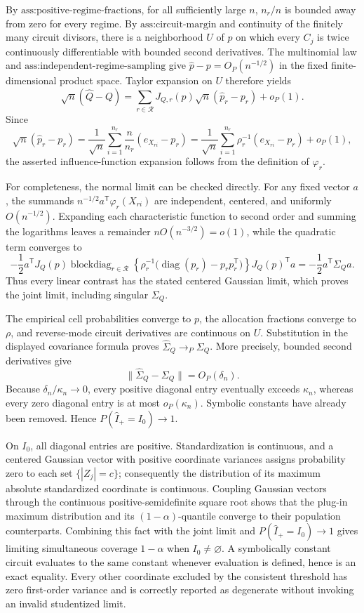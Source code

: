 By \(\text{ass:positive-regime-fractions}\), for all sufficiently large \(n\), \(n_r/n\) is bounded away from zero for every regime.  By \(\text{ass:circuit-margin}\) and continuity of the finitely many circuit divisors, there is a neighborhood \(U\) of \(p\) on which every \(C_j\) is twice continuously differentiable with bounded second derivatives.  The multinomial law and \(\text{ass:independent-regime-sampling}\) give \(\widehat p-p=O_P(n^{-1/2})\) in the fixed finite-dimensional product space.  Taylor expansion on \(U\) therefore yields
\[
 \sqrt n(\widehat Q-Q)=\sum_{r\in\mathcal R}J_{Q,r}(p)\sqrt n(\widehat p_r-p_r)+o_P(1).
\]
Since
\[
 \sqrt n(\widehat p_r-p_r)=\frac1{\sqrt n}\sum_{i=1}^{n_r}\frac{n}{n_r}(e_{X_{ri}}-p_r)
 =\frac1{\sqrt n}\sum_{i=1}^{n_r}\rho_r^{-1}(e_{X_{ri}}-p_r)+o_P(1),
\]
the asserted influence-function expansion follows from the definition of \(\varphi_r\).

For completeness, the normal limit can be checked directly.  For any fixed vector \(a\), the summands \(n^{-1/2}a^{\mathsf T}\varphi_r(X_{ri})\) are independent, centered, and uniformly \(O(n^{-1/2})\).  Expanding each characteristic function to second order and summing the logarithms leaves a remainder \(nO(n^{-3/2})=o(1)\), while the quadratic term converges to
\[
 -\frac12a^{\mathsf T}J_Q(p)\operatorname{blockdiag}_{r\in\mathcal R}
 \left\{\rho_r^{-1}\bigl(\operatorname{diag}(p_r)-p_rp_r^{\mathsf T}\bigr)\right\}
 J_Q(p)^{\mathsf T}a=-\frac12a^{\mathsf T}\Sigma_Qa.
\]
Thus every linear contrast has the stated centered Gaussian limit, which proves the joint limit, including singular \(\Sigma_Q\).

The empirical cell probabilities converge to \(p\), the allocation fractions converge to \(\rho\), and reverse-mode circuit derivatives are continuous on \(U\).  Substitution in the displayed covariance formula proves \(\widehat\Sigma_Q\to_P\Sigma_Q\).  More precisely, bounded second derivatives give
\[
 \|\widehat\Sigma_Q-\Sigma_Q\|=O_P(\delta_n).
\]
Because \(\delta_n/\kappa_n\to0\), every positive diagonal entry eventually exceeds \(\kappa_n\), whereas every zero diagonal entry is at most \(o_P(\kappa_n)\).  Symbolic constants have already been removed.  Hence \(P(\widehat I_+=I_0)\to1\).

On \(I_0\), all diagonal entries are positive.  Standardization is continuous, and a centered Gaussian vector with positive coordinate variances assigns probability zero to each set \(\{|Z_j|=c\}\); consequently the distribution of its maximum absolute standardized coordinate is continuous.  Coupling Gaussian vectors through the continuous positive-semidefinite square root shows that the plug-in maximum distribution and its \((1-\alpha)\)-quantile converge to their population counterparts.  Combining this fact with the joint limit and \(P(\widehat I_+=I_0)\to1\) gives limiting simultaneous coverage \(1-\alpha\) when \(I_0\ne\varnothing\).  A symbolically constant circuit evaluates to the same constant whenever evaluation is defined, hence is an exact equality.  Every other coordinate excluded by the consistent threshold has zero first-order variance and is correctly reported as degenerate without invoking an invalid studentized limit.

